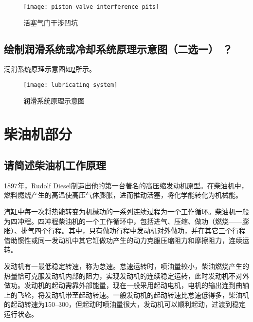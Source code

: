 \documentclass[UTF8]{ctexart}
\numberwithin{figure}{section}
\numberwithin{table}{section}
\begin{document}
\begin{figure}[htbp]
	\centering
	\begin{minipage}[b]{0.4\textwidth}
		\centering
		\texttt{[image: piston valve interference pits]}
		\caption{活塞气门干涉凹坑}
		\label{piston valve interference pits}
	\end{minipage}
\end{figure}

\subsection{绘制润滑系统或冷却系统原理示意图（二选一） ？}

润滑系统原理示意图如\cref{lubricating system}所示。

\begin{figure}[htbp]
	\centering
	\begin{minipage}[b]{\textwidth}
		\centering
		\texttt{[image: lubricating system]}
		\caption{润滑系统原理示意图}
		\label{lubricating system}
	\end{minipage}
\end{figure}

\clearpage

\section{柴油机部分}
\subsection{请简述柴油机工作原理}

1897年，Rudolf Diesel制造出他的第一台著名的高压缩发动机原型。在柴油机中，燃料燃烧产生的高温使高压气体膨胀，进而推动活塞，将化学能转化为机械能。

汽缸中每一次将热能转变为机械功的一系列连续过程为一个工作循环。柴油机一般为四冲程。四冲程柴油机的一个工作循环中，包括进气、压缩、做功（燃烧——膨胀）、排气四个行程。其中，只有做功行程中发动机对外做功，并在其它三个行程借助惯性或同一发动机中其它缸做功产生的动力克服压缩阻力和摩擦阻力，连续运转。

发动机有一最低稳定转速，称为怠速。怠速运转时，喷油量较小，柴油燃烧产生的热量恰可克服发动机内部的阻力，实现发动机的连续稳定运转，此时发动机不对外做功。发动机的起动需靠外部能量，现在一般采用起动电机，电机的输出连到曲轴上的飞轮，将发动机带至起动转速。一般发动机的起动转速比怠速低得多，柴油机的起动转速为\qtyrange[range-phrase = $\,\sim\,$, range-units = single]{150}{300}{\rpm}，但起动时喷油量很大，发动机可以顺利起动，过渡到稳定运行状态。
\end{document}
